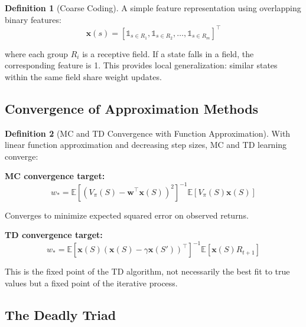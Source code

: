 \documentclass[12pt,a4paper]{article}
\theoremstyle{definition}
\newtheorem{definition}{Definition}[section]
\begin{document}
\begin{definition}[Coarse Coding]
A simple feature representation using overlapping binary features:
\[
\mathbf{x}(s) = [\mathbb{1}_{s \in R_1}, \mathbb{1}_{s \in R_2}, \ldots, \mathbb{1}_{s \in R_m}]^\top
\]

where each group $R_i$ is a receptive field. If a state falls in a field, the corresponding feature is 1. This provides local generalization: similar states within the same field share weight updates.
\end{definition}

\subsection{Convergence of Approximation Methods}

\begin{definition}[MC and TD Convergence with Function Approximation]
With linear function approximation and decreasing step sizes, MC and TD learning converge:

\textbf{MC convergence target:}
\[
w_* = \mathbb{E}[(V_\pi(S) - \mathbf{w}^\top \mathbf{x}(S))^2]^{-1} \mathbb{E}[V_\pi(S) \mathbf{x}(S)]
\]

Converges to minimize expected squared error on observed returns.

\textbf{TD convergence target:}
\[
w_* = \mathbb{E}[\mathbf{x}(S)(\mathbf{x}(S) - \gamma \mathbf{x}(S'))^\top]^{-1} \mathbb{E}[\mathbf{x}(S) R_{t+1}]
\]

This is the fixed point of the TD algorithm, not necessarily the best fit to true values but a fixed point of the iterative process.
\end{definition}

\subsection{The Deadly Triad}
\end{document}
